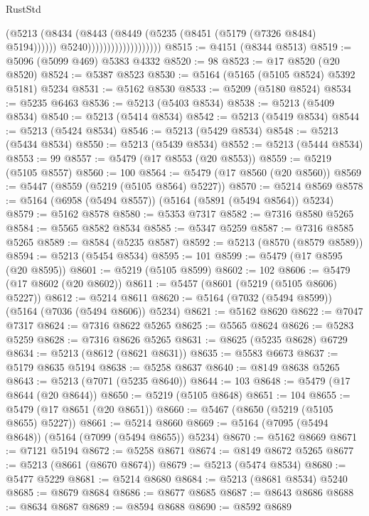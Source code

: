 \begin{lexlean}{RustStd}
\begin{coremodule}
                                        (@5213
                                          (@8434
                                            (@8443
                                              (@8449 (@5235 (@8451 (@5179 (@7326 @8484) @5194))))))
                                          @5240)))))))))))))))))))
@8515 := @4151 (@8344 @8513)
@8519 := @5096 (@5099 @469) @5383 @4332
@8520 := 98
@8523 := @17 @8520 (@20 @8520)
@8524 := @5387 @8523
@8530 := @5164 (@5165 (@5105 @8524) @5392 @5181) @5234
@8531 := @5162 @8530
@8533 := @5209 (@5180 @8524)
@8534 := @5235 @6463
@8536 := @5213 (@5403 @8534)
@8538 := @5213 (@5409 @8534)
@8540 := @5213 (@5414 @8534)
@8542 := @5213 (@5419 @8534)
@8544 := @5213 (@5424 @8534)
@8546 := @5213 (@5429 @8534)
@8548 := @5213 (@5434 @8534)
@8550 := @5213 (@5439 @8534)
@8552 := @5213 (@5444 @8534)
@8553 := 99
@8557 := @5479 (@17 @8553 (@20 @8553))
@8559 := @5219 (@5105 @8557)
@8560 := 100
@8564 := @5479 (@17 @8560 (@20 @8560))
@8569 := @5447 (@8559 (@5219 (@5105 @8564) @5227))
@8570 := @5214 @8569
@8578 := @5164 (@6958 (@5494 @8557)) (@5164 (@5891 (@5494 @8564)) @5234)
@8579 := @5162 @8578
@8580 := @5353 @7317
@8582 := @7316 @8580 @5265
@8584 := @5565 @8582 @8534
@8585 := @5347 @5259
@8587 := @7316 @8585 @5265
@8589 := @8584 (@5235 @8587)
@8592 := @5213 (@8570 (@8579 @8589))
@8594 := @5213 (@5454 @8534)
@8595 := 101
@8599 := @5479 (@17 @8595 (@20 @8595))
@8601 := @5219 (@5105 @8599)
@8602 := 102
@8606 := @5479 (@17 @8602 (@20 @8602))
@8611 := @5457 (@8601 (@5219 (@5105 @8606) @5227))
@8612 := @5214 @8611
@8620 := @5164 (@7032 (@5494 @8599)) (@5164 (@7036 (@5494 @8606)) @5234)
@8621 := @5162 @8620
@8622 := @7047 @7317
@8624 := @7316 @8622 @5265
@8625 := @5565 @8624
@8626 := @5283 @5259
@8628 := @7316 @8626 @5265
@8631 := @8625 (@5235 @8628) @6729
@8634 := @5213 (@8612 (@8621 @8631))
@8635 := @5583 @6673
@8637 := @5179 @8635 @5194
@8638 := @5258 @8637
@8640 := @8149 @8638 @5265
@8643 := @5213 (@7071 (@5235 @8640))
@8644 := 103
@8648 := @5479 (@17 @8644 (@20 @8644))
@8650 := @5219 (@5105 @8648)
@8651 := 104
@8655 := @5479 (@17 @8651 (@20 @8651))
@8660 := @5467 (@8650 (@5219 (@5105 @8655) @5227))
@8661 := @5214 @8660
@8669 := @5164 (@7095 (@5494 @8648)) (@5164 (@7099 (@5494 @8655)) @5234)
@8670 := @5162 @8669
@8671 := @7121 @5194
@8672 := @5258 @8671
@8674 := @8149 @8672 @5265
@8677 := @5213 (@8661 (@8670 @8674))
@8679 := @5213 (@5474 @8534)
@8680 := @5477 @5229
@8681 := @5214 @8680
@8684 := @5213 (@8681 @8534) @5240
@8685 := @8679 @8684
@8686 := @8677 @8685
@8687 := @8643 @8686
@8688 := @8634 @8687
@8689 := @8594 @8688
@8690 := @8592 @8689

\end{coremodule}
\end{lexlean}
